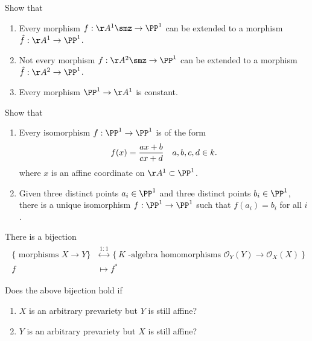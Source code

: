 \begin{exercise}[Gathmann 5.7]

Show that

\begin{enumerate}
\def\labelenumi{\alph{enumi}.}
\item
  Every morphism \(f:\AA^1\smz \to \PP^1\) can be extended to a morphism
  \(\hat f: \AA^1 \to \PP^1\).
\item
  Not every morphism \(f:\AA^2\smz \to \PP^1\) can be extended to a
  morphism \(\hat f: \AA^2 \to \PP^1\).
\item
  Every morphism \(\PP^1\to \AA^1\) is constant.
\end{enumerate}

\end{exercise}

\begin{exercise}[Gathmann 5.8]

Show that

\begin{enumerate}
\def\labelenumi{\alph{enumi}.}
\item
  Every isomorphism \(f:\PP^1\to \PP^1\) is of the form
  \begin{align*}  
  f(x) = {ax+b \over cx+d} && a,b,c,d\in k
  .\end{align*} where \(x\) is an affine coordinate on
  \(\AA^1\subset \PP^1\).
\item
  Given three distinct points \(a_i \in \PP^1\) and three distinct
  points \(b_i \in \PP^1\), there is a unique isomorphism
  \(f:\PP^1 \to \PP^1\) such that \(f(a_i) = b_i\) for all \(i\).
\end{enumerate}

\end{exercise}

\begin{proposition}[?]

There is a bijection
\begin{align*}
\begin{array}{c}
\{\text { morphisms } X \rightarrow Y\} 
&\stackrel{1: 1}{\longleftrightarrow}\left\{K \text { -algebra homomorphisms } \mathscr{O}_{Y}(Y) \rightarrow \mathscr{O}_{X}(X)\right\} \\
f &\longmapsto f^{*}
\end{array}
\end{align*}

\end{proposition}

\begin{exercise}[Gathmann 5.9]

Does the above bijection hold if

\begin{enumerate}
\def\labelenumi{\alph{enumi}.}
\tightlist
\item
  \(X\) is an arbitrary prevariety but \(Y\) is still affine?
\item
  \(Y\) is an arbitrary prevariety but \(X\) is still affine?
\end{enumerate}

\end{exercise}

